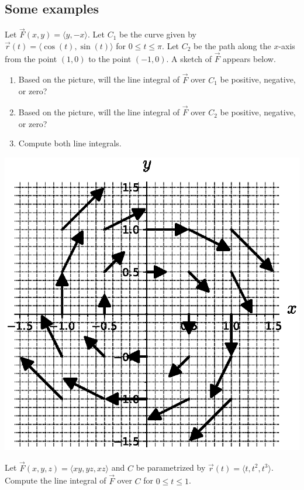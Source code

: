 \subsection{Some examples}
\begin{ex}
    Let $\vec{F}(x,y)=\langle y,-x\rangle$. Let $C_1$ be the curve given by $\vec{r}(t)=\langle \cos(t),\sin(t)\rangle$ for $0\le t\le \pi$. Let $C_2$ be the path along the $x$-axis from the point $(1,0)$ to the point $(-1,0)$. A sketch of $\vec{F}$ appears below.
    \begin{enumerate}
        \item Based on the picture, will the line integral of $\vec{F}$ over $C_1$ be positive, negative, or zero?
        \item Based on the picture, will the line integral of $\vec{F}$ over $C_2$ be positive, negative, or zero?
        \item Compute both line integrals.
    \end{enumerate}
    \mbox{}\hfill\includegraphics[scale=.8]{images/cw-circulating-vf.eps}\label{img:sage-vector-field-4}
\end{ex}
\pagebreak 
\begin{ex}
    Let $\vec{F}(x,y,z)=\langle xy,yz,xz\rangle$ and $C$ be parametrized by $\vec{r}(t)=\langle t,t^2,t^3\rangle$. 
    \\ 
    Compute the line integral of $\vec{F}$ over $C$ for $0\le t\le 1$.
\end{ex}


